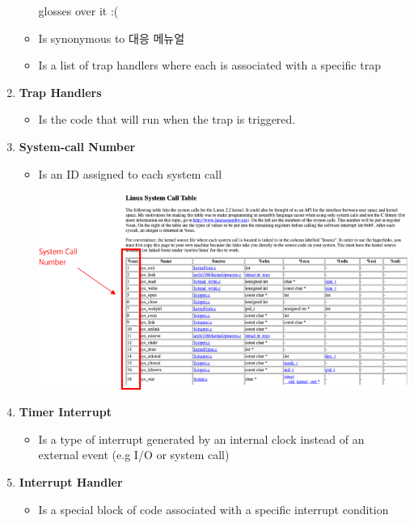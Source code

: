\documentclass[12pt]{article}
\begin{document}
\begin{mdframed}
\begin{enumerate}[1.]
\begin{itemize}
        glosses over it :(
        \item Is synonymous to 대응 메뉴얼
        \item Is a list of trap handlers where each is associated with a specific trap
    \end{itemize}
    \item \textbf{Trap Handlers}
    \begin{itemize}
        \item Is the code that will run when the trap is triggered.
    \end{itemize}
    \item \textbf{System-call Number}
    \begin{itemize}
        \item Is an ID assigned to each system call

        \bigskip

        \begin{center}
        \includegraphics[width=0.9\linewidth]{images/notes_4_7.png}
        \end{center}
    \end{itemize}
    \item \textbf{Timer Interrupt}
    \begin{itemize}
        \item Is a type of interrupt generated by an internal clock instead of an external event (e.g I/O or system call)
    \end{itemize}
    \item \textbf{Interrupt Handler}
    \begin{itemize}
        \item Is a special block of code associated with a specific interrupt condition
    \end{itemize}
\end{enumerate}

\end{mdframed}
\end{document}
